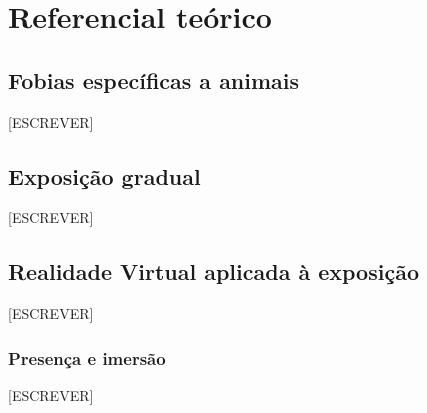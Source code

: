 \section{Referencial teórico}

%

\subsection{Fobias específicas a animais}

[ESCREVER]

\subsection{Exposição gradual}

%
[ESCREVER]

\subsection{Realidade Virtual aplicada à exposição}

[ESCREVER]

\subsubsection{Presença e imersão}

[ESCREVER]

